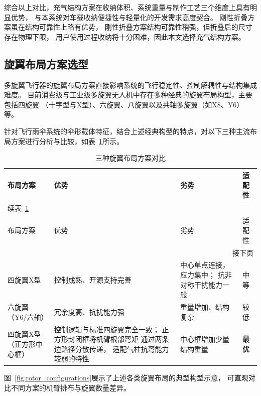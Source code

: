 综合以上对比，充气结构方案在收纳体积、系统重量与制作工艺三个维度上具有明显优势，
与本系统对车载收纳便捷性与轻量化的开发需求高度契合。
刚性折叠方案虽在结构可靠性上略有优势，
刚性折叠方案结构可靠性稍强，但折叠后的尺寸存在物理下限，
用户使用过程收纳将十分困难，因此本文选择充气结构方案。

\subsection{旋翼布局方案选型}
多旋翼飞行器的旋翼布局方案直接影响系统的飞行稳定性、控制解耦性与结构集成难度。
目前消费级与工业级多旋翼无人机中存在多种经典的旋翼布局构型，主要包括四旋翼
（十字型与X型）、六旋翼、八旋翼以及共轴多旋翼（如X8、Y6）等\cite{Camilli2015}。

针对飞行雨伞系统的伞形载体特征，结合上述经典构型的特点，对以下三种主流布局方案进行分析与比较，如表~\ref{tab:rotor_compare}所示。

\begin{longtable}{p{2.8cm} p{3.6cm} p{3.6cm} p{1.5cm}}
    \caption{三种旋翼布局方案对比}
    \label{tab:rotor_compare} \\
    \toprule
    布局方案 & 优势 & 劣势 & 适配性 \\
    \midrule
    \endfirsthead
    \multicolumn{4}{l}{\small 续表~\ref*{tab:rotor_compare}} \\[2pt]
    \toprule
    布局方案 & 优势 & 劣势 & 适配性 \\
    \midrule
    \endhead
    \midrule
    \multicolumn{4}{r}{\small 接下页} \\
    \endfoot
    \bottomrule
    \endlastfoot
    四旋翼X型
        & 控制成熟、开源支持完善
        & 中心单点连接，应力集中；
          抗非对称干扰能力一般
        & 中等 \\[4pt]
    六旋翼（Y6/六轴）
        & 冗余度高、抗扰能力强
        & 重量增加、结构复杂
        & 较低 \\[4pt]
    四旋翼X型（正方形中心框）
        & 控制逻辑与标准四旋翼完全一致；
          正方形封闭框将机臂根部弯矩
          通过两条边路径分散传递，
          适配气柱抗弯能力较弱的特性
        & 中心框增加少量结构重量
        & \textbf{最优} \\
\end{longtable}

图~\ref{fig:rotor_configurations}展示了上述各类旋翼布局的典型构型示意，
可直观对比不同方案的机臂排布与旋翼数量差异。

